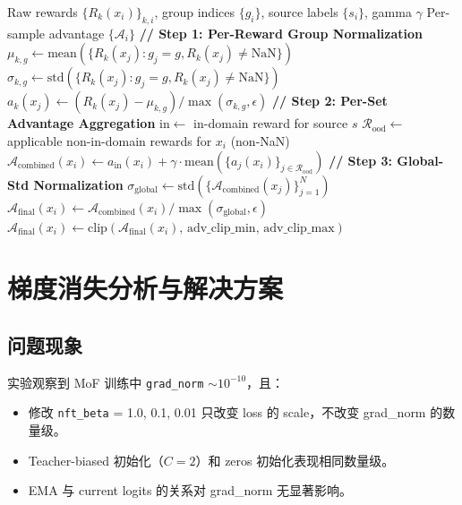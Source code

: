 \documentclass[11pt,a4paper]{article}
\theoremstyle{definition}
\begin{document}
\begin{algorithm}[H]
\caption{MoF Advantage Pipeline (Recommended: Option B)}
\label{alg:advantage_pipeline}
\begin{algorithmic}[1]
\Require Raw rewards $\{R_k(x_i)\}_{k,i}$, group indices $\{g_i\}$, source labels $\{s_i\}$, gamma $\gamma$
\Ensure Per-sample advantage $\{\mathcal{A}_i\}$
\Statex
\Statex \textbf{// Step 1: Per-Reward Group Normalization}
        \State $\mu_{k,g} \gets \mathrm{mean}(\{R_k(x_j) : g_j = g, R_k(x_j) \neq \mathrm{NaN}\})$
        \State $\sigma_{k,g} \gets \mathrm{std}(\{R_k(x_j) : g_j = g, R_k(x_j) \neq \mathrm{NaN}\})$
            \State $a_k(x_j) \gets (R_k(x_j) - \mu_{k,g}) / \max(\sigma_{k,g}, \epsilon)$
        \EndFor
    \EndFor
\EndFor
\Statex
\Statex \textbf{// Step 2: Per-Set Advantage Aggregation}
    \State $\mathrm{in} \gets$ in-domain reward for source $s$
    \State $\mathcal{R}_{\mathrm{ood}} \gets$ applicable non-in-domain rewards for $x_i$ (non-NaN)
    \State $\mathcal{A}_{\mathrm{combined}}(x_i) \gets a_{\mathrm{in}}(x_i) + \gamma \cdot \mathrm{mean}(\{a_j(x_i)\}_{j \in \mathcal{R}_{\mathrm{ood}}})$
\EndFor
\Statex
\Statex \textbf{// Step 3: Global-Std Normalization}
\State $\sigma_{\mathrm{global}} \gets \mathrm{std}(\{\mathcal{A}_{\mathrm{combined}}(x_j)\}_{j=1}^N)$
    \State $\mathcal{A}_{\mathrm{final}}(x_i) \gets \mathcal{A}_{\mathrm{combined}}(x_i) / \max(\sigma_{\mathrm{global}}, \epsilon)$
    \State $\mathcal{A}_{\mathrm{final}}(x_i) \gets \mathrm{clip}(\mathcal{A}_{\mathrm{final}}(x_i),\, \mathrm{adv\_clip\_min},\, \mathrm{adv\_clip\_max})$
\EndFor
\end{algorithmic}
\end{algorithm}

\section{梯度消失分析与解决方案}
\label{sec:gradient_vanishing}

\subsection{问题现象}

实验观察到 MoF 训练中 \texttt{grad\_norm} $\sim 10^{-10}$，且：
\begin{itemize}[leftmargin=1.5em]
\item 修改 \texttt{nft\_beta} = 1.0, 0.1, 0.01 只改变 loss 的 scale，不改变 grad\_norm 的数量级。
\item Teacher-biased 初始化（$C=2$）和 zeros 初始化表现相同数量级。
\item EMA 与 current logits 的关系对 grad\_norm 无显著影响。
\end{itemize}
\end{document}
